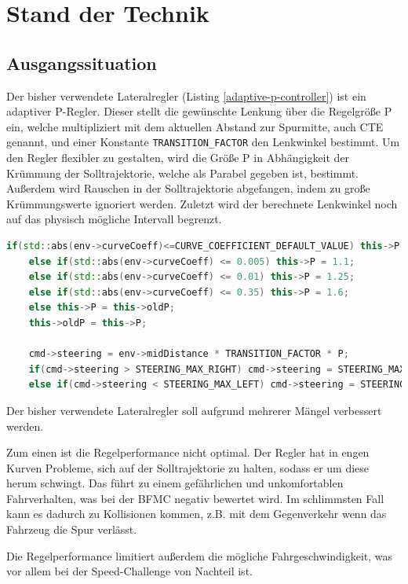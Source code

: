 \section{Stand der Technik}

\subsection{Ausgangssituation}
Der bisher verwendete Lateralregler (Listing \ref{adaptive-p-controller}) ist ein adaptiver P-Regler.
Dieser stellt die gewünschte Lenkung über die Regelgröße P ein, welche multipliziert mit dem aktuellen Abstand zur Spurmitte, auch \gls{CTE} genannt, und einer Konstante \texttt{TRANSITION\_FACTOR} den Lenkwinkel bestimmt.
Um den Regler flexibler zu gestalten, wird die Größe P in Abhängigkeit der Krümmung der Solltrajektorie, welche als Parabel gegeben ist, bestimmt.
Außerdem wird Rauschen in der Solltrajektorie abgefangen, indem zu große Krümmungswerte ignoriert werden.
Zuletzt wird der berechnete Lenkwinkel noch auf das physisch mögliche Intervall begrenzt.

\begin{lstlisting}[language=C++, caption={Adaptiver P-Regler}, label={adaptive-p-controller}]
    if(std::abs(env->curveCoeff)<=CURVE_COEFFICIENT_DEFAULT_VALUE) this->P = 0.8;
    else if(std::abs(env->curveCoeff) <= 0.005) this->P = 1.1;
    else if(std::abs(env->curveCoeff) <= 0.01) this->P = 1.25;
    else if(std::abs(env->curveCoeff) <= 0.35) this->P = 1.6;
    else this->P = this->oldP;
    this->oldP = this->P;

    cmd->steering = env->midDistance * TRANSITION_FACTOR * P;
    if(cmd->steering > STEERING_MAX_RIGHT) cmd->steering = STEERING_MAX_RIGHT;
    else if(cmd->steering < STEERING_MAX_LEFT) cmd->steering = STEERING_MAX_LEFT;
\end{lstlisting}

Der bisher verwendete Lateralregler soll aufgrund mehrerer Mängel verbessert werden.

Zum einen ist die Regelperformance nicht optimal.
Der Regler hat in engen Kurven Probleme, sich auf der Solltrajektorie zu halten, sodass er um diese herum schwingt.
Das führt zu einem gefährlichen und unkomfortablen Fahrverhalten, was bei der \gls{BFMC} negativ bewertet wird.
Im schlimmsten Fall kann es dadurch zu Kollisionen kommen, z.B. mit dem Gegenverkehr wenn das Fahrzeug die Spur verlässt.

Die Regelperformance limitiert außerdem die mögliche Fahrgeschwindigkeit, was vor allem bei der Speed-Challenge von Nachteil ist.

